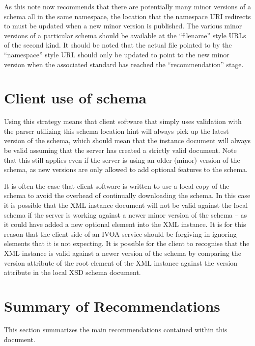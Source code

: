 \documentclass[10pt,a4paper]{ivoa}
\begin{document}
As this note now recommends that there are potentially many minor versions of a
schema all in the same namespace, the location that the namespace URI
redirects to must be updated when a new minor version is published. The
various minor versions of a particular schema should be available at the
``filename'' style URLs of the second kind. It should be noted that the
actual file pointed to by the ``namespace'' style URL should only be updated to
point to the new minor version when the associated standard has reached the
``recommendation'' stage.

\section{Client use of schema}
Using this strategy means that client software that simply uses validation with
the parser utilizing this schema location hint will always pick up the latest
version of the schema, which should mean that the instance document will always
be valid assuming that the server has created a strictly valid document. Note
that this still applies even if the server is using an older (minor) version of
the schema, as new versions are only allowed to add optional features to the
schema.

It is often the case that client software is written to use a local copy of the
schema to avoid the overhead of continually downloading the schema. In this case
it is possible that the XML instance document will not be valid against the
local schema if the server is working against a newer minor version of the
schema -- as it could have added a new optional element into the XML instance.
It is for this reason that the client side of an IVOA service should be
forgiving in ignoring elements that it is not expecting. It is possible for the
client to recognise that the XML instance is valid against a newer version of
the schema by comparing the version attribute of the root element of the XML
instance against the version attribute in the local XSD schema document.

\section{Summary of Recommendations}
This section summarizes the main recommendations contained within this document.
\end{document}

